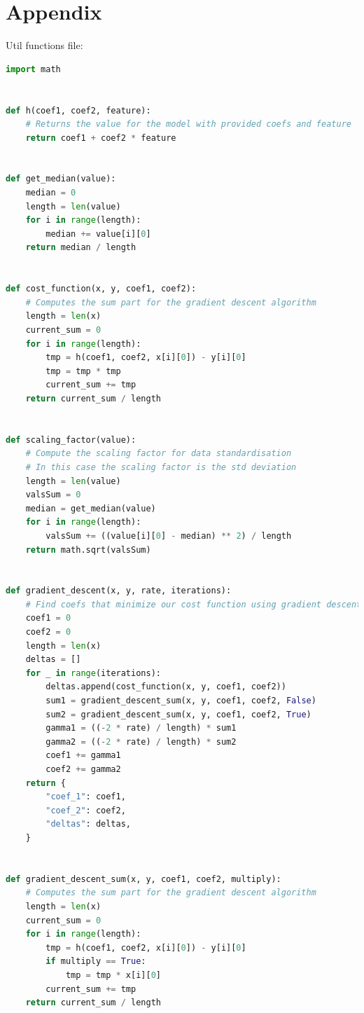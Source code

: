 \documentclass[10pt]{article}
\begin{document}
\section*{Appendix}
Util functions file:
\begin{lstlisting}[language=Python]
import math


def h(coef1, coef2, feature):
    # Returns the value for the model with provided coefs and feature
    return coef1 + coef2 * feature


def get_median(value):
    median = 0
    length = len(value)
    for i in range(length):
        median += value[i][0]
    return median / length


def cost_function(x, y, coef1, coef2):
    # Computes the sum part for the gradient descent algorithm
    length = len(x)
    current_sum = 0
    for i in range(length):
        tmp = h(coef1, coef2, x[i][0]) - y[i][0]
        tmp = tmp * tmp
        current_sum += tmp
    return current_sum / length


def scaling_factor(value):
    # Compute the scaling factor for data standardisation
    # In this case the scaling factor is the std deviation
    length = len(value)
    valsSum = 0
    median = get_median(value)
    for i in range(length):
        valsSum += ((value[i][0] - median) ** 2) / length
    return math.sqrt(valsSum)


def gradient_descent(x, y, rate, iterations):
    # Find coefs that minimize our cost function using gradient descent
    coef1 = 0
    coef2 = 0
    length = len(x)
    deltas = []
    for _ in range(iterations):
        deltas.append(cost_function(x, y, coef1, coef2))
        sum1 = gradient_descent_sum(x, y, coef1, coef2, False)
        sum2 = gradient_descent_sum(x, y, coef1, coef2, True)
        gamma1 = ((-2 * rate) / length) * sum1
        gamma2 = ((-2 * rate) / length) * sum2
        coef1 += gamma1
        coef2 += gamma2
    return {
        "coef_1": coef1,
        "coef_2": coef2,
        "deltas": deltas,
    }


def gradient_descent_sum(x, y, coef1, coef2, multiply):
    # Computes the sum part for the gradient descent algorithm
    length = len(x)
    current_sum = 0
    for i in range(length):
        tmp = h(coef1, coef2, x[i][0]) - y[i][0]
        if multiply == True:
            tmp = tmp * x[i][0]
        current_sum += tmp
    return current_sum / length    
\end{lstlisting}
\end{document}
